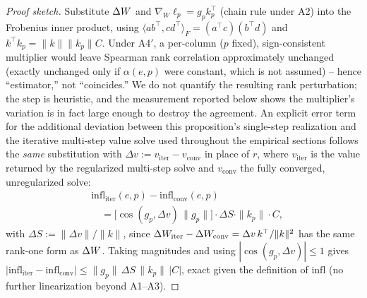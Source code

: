 \begin{proof}[Proof sketch]
Substitute $\Delta W$ and $\nabla_W\ell_p=g_pk_p^{\top}$ (chain rule under A2) into the
Frobenius inner product, using $\langle ab^\top,cd^\top\rangle_F=(a^\top c)(b^\top d)$ and
$k^\top k_p=\|k\|\|k_p\|C$. Under A4$'$, a per-column ($p$ fixed),
sign-consistent multiplier would leave Spearman rank correlation
approximately unchanged (exactly unchanged only if $\alpha(e,p)$ were constant, which is
not assumed) -- hence ``estimator,'' not ``coincides.'' We do not quantify the
resulting rank perturbation; the step is heuristic, and the measurement reported
below shows the multiplier's variation is in fact large enough to destroy the
agreement. An explicit error term for the
additional deviation between this proposition's single-step realization and the
iterative multi-step value solve used throughout the empirical sections follows the
\emph{same} substitution with $\Delta v:=v_{\text{iter}}-v_{\text{conv}}$ in place of $r$,
where $v_{\text{iter}}$ is the value returned by the regularized multi-step solve and
$v_{\text{conv}}$ the fully converged, unregularized solve:
\begin{align*}
&\mathrm{infl}_{\text{iter}}(e,p)-\mathrm{infl}_{\text{conv}}(e,p)\\
&\quad= \big[\cos(g_p,\Delta v)\,\|g_p\|\big]\cdot \Delta S\cdot\|k_p\|\cdot C,
\end{align*}
with $\Delta S := \|\Delta v\|/\|k\|$,
since $\Delta W_{\text{iter}}-\Delta W_{\text{conv}}=\Delta v\,k^{\top}/\|k\|^2$ has the same
rank-one form as $\Delta W$. Taking magnitudes and using $|\cos(g_p,\Delta v)|\le 1$ gives
$\big|\mathrm{infl}_{\text{iter}}-\mathrm{infl}_{\text{conv}}\big|\le \|g_p\|\,\Delta S\,\|k_p\|\,|C|$,
exact given the definition of $\mathrm{infl}$ (no further linearization beyond A1--A3).
\end{proof}
\fi
\iftaslp
